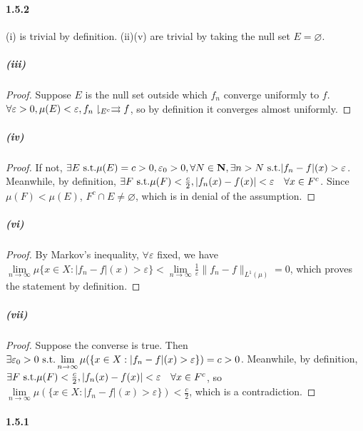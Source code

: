 \documentclass{article}
\begin{document}
\paragraph{1.5.2}
(i) is trivial by definition. (ii)(v) are trivial by taking the null set $E=\varnothing$.
\subparagraph{(iii)}
\begin{proof}
Suppose $E$ is the null set outside which $f_n$ converge uniformly to $f$. $\forall \varepsilon>0,\mu(E)<\varepsilon, f_n\downharpoonright_{E^c}\rightrightarrows f$, so by definition it converges almost uniformly.
\end{proof}
\subparagraph{(iv)}
\begin{proof}
If not, $\exists E\text{ s.t.} \mu(E)=c>0, \varepsilon_0>0,\forall N\in\mathbf{N},\exists n>N\text{ s.t.} |f_n-f|(x)>\varepsilon$. Meanwhile, by definition, $\exists F\text{ s.t.}\mu(F)<\frac{c}{2}, |f_n(x)-f(x)|<\varepsilon\quad \forall x\in F^c$. Since $\mu(F)<\mu(E)$, $F^c\cap E\neq\varnothing$, which is in denial of the assumption.  
\end{proof}
\subparagraph{(vi)}
\begin{proof}
By Markov's inequality, $\forall\varepsilon$ fixed, we have $\lim\limits_{n\to\infty}\mu\{x\in X:|f_n-f|(x)>\varepsilon\}<\lim\limits_{n\to\infty}\frac{1}{\varepsilon}\|f_n-f\|_{L^1(\mu)}=0$, which proves the statement by definition.
\end{proof}
\subparagraph{(vii)}
\begin{proof}
Suppose the converse is true. Then $\exists \varepsilon_0>0\text{ s.t.} \lim\limits_{n\to\infty}\mu(\{x\in X:|f_n-f|(x)>\varepsilon\})=c>0$. Meanwhile, by definition, $\exists F\text{ s.t.}\mu(F)<\frac{c}{2}, |f_n(x)-f(x)|<\varepsilon\quad \forall x\in F^c$, so $\lim\limits_{n\to\infty}\mu(\{x\in X:|f_n-f|(x)>\varepsilon\})<\frac{c}{2}$, which is a contradiction. 
\end{proof}

\paragraph{1.5.1}
\end{document}
